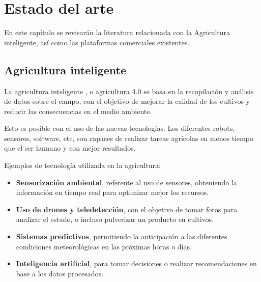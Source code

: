 \chapter{Estado del arte}

 En este capítulo se revisarán la literatura relacionada con la Agricultura inteligente, así como las plataformas comerciales existentes.



\section{Agricultura inteligente}



La agricultura inteligente \cite{agricultura-40}, o agricultura 4.0 se basa en la recopilación y análisis de datos sobre el campo, con el objetivo de mejorar la calidad de los cultivos y reducir las consecuencias en el medio ambiente.

Esto es posible con el uso de las nuevas tecnologías. Los diferentes robots, sensores, software, etc, son capaces de realizar tareas agrícolas en menos tiempo que el ser humano y con mejor resultados.

Ejemplos de tecnología utilizada en la agricultura:

\begin{itemize}
    \item \textbf{Sensorización ambiental}, referente al uso de sensores, obteniendo la información en tiempo real para optimizar mejor los recursos.
    \item \textbf{Uso de drones y teledetección}, con el objetivo de tomar fotos para analizar el estado, o incluso pulverizar un producto en cultivos.
    \item \textbf{Sistemas predictivos}, permitiendo la anticipación a las diferentes condiciones meteorológicas en las próximas horas o días.
    \item \textbf{Inteligencia artificial}, para tomar decisiones o realizar recomendaciones en base a los datos procesados.
    
\end{itemize}

